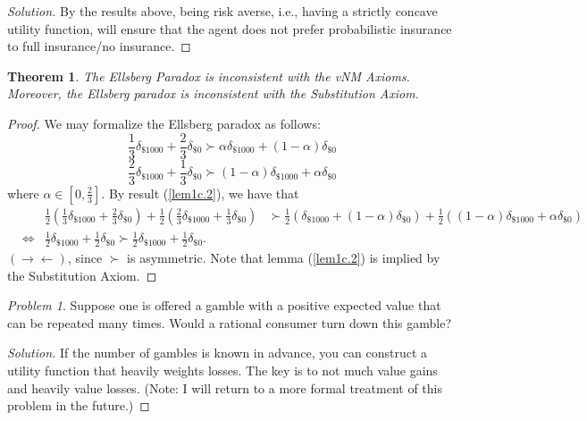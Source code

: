 \documentclass[12pt]{article}
\newtheorem{thm}{Theorem}[section]
\theoremstyle{definition}
\theoremstyle{remark}
\newtheorem{prob}{Problem}[section]
\def\contra{\rightarrow \leftarrow}
\begin{document}
\begin{proof}[Solution]
  By the results above, being risk averse, i.e., having a strictly concave utility function, will ensure that the agent does not prefer probabilistic insurance to full insurance/no insurance.
\end{proof}
%
%
\begin{thm}
  The Ellsberg Paradox is inconsistent with the vNM Axioms. Moreover, the Ellsberg paradox is inconsistent with the Substitution Axiom.
\end{thm}
\begin{proof}
  We may formalize the Ellsberg paradox as follows:
  $$\frac{1}{3}\delta_{\$1000} + \frac{2}{3}\delta_{\$0} \succ \alpha \delta_{\$1000} + (1 - \alpha)\delta_{\$0}$$
  $$\frac{2}{3}\delta_{\$1000} + \frac{1}{3}\delta_{\$0} \succ (1 - \alpha) \delta_{\$1000} + \alpha\delta_{\$0}$$
  where $\alpha \in [0, \frac{2}{3}]$.
  By result (\ref{lem1c.2}), we have that
  \begin{align*}
  &&  \frac{1}{2}(\frac{1}{3}\delta_{\$1000} + \frac{2}{3}\delta_{\$0}) + \frac{1}{2}(\frac{2}{3}\delta_{\$1000} + \frac{1}{3}\delta_{\$0}) &\succ \frac{1}{2}(\delta_{\$1000} + (1 - \alpha)\delta_{\$0}) + \frac{1}{2}((1 - \alpha) \delta_{\$1000} + \alpha\delta_{\$0}) \\
  & \iff & \frac{1}{2}\delta_{\$1000} + \frac{1}{2}\delta_{\$0} \succ \frac{1}{2} \delta_{\$1000} + \frac{1}{2}\delta_{\$0}.
  \end{align*}
  $(\contra)$, since $\succ$ is asymmetric. Note that lemma (\ref{lem1c.2}) is implied by the Substitution Axiom.
\end{proof}
%
%
\begin{prob}
  Suppose one is offered a gamble with a positive expected value that can be repeated many times. Would a rational consumer turn down this gamble?
\end{prob}
\begin{proof}[Solution]
  If the number of gambles is known in advance, you can construct a utility function that heavily weights losses. The key is to not much value gains and heavily value losses. (Note: I will return to a more formal treatment of this problem in the future.)
\end{proof}
\end{document}
